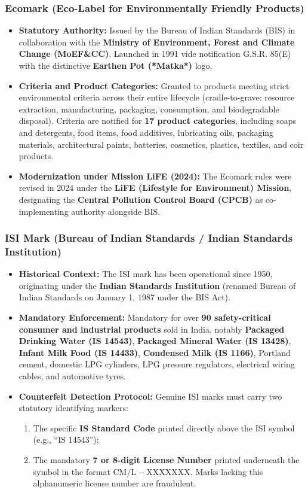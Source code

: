 \documentclass[11pt,a4paper,oneside]{article}
\begin{document}
\subsubsection{Ecomark (Eco-Label for Environmentally Friendly Products)}
\begin{itemize}[leftmargin=*]
    \item \textbf{Statutory Authority:} Issued by the Bureau of Indian Standards (BIS) in collaboration with the \textbf{Ministry of Environment, Forest and Climate Change (MoEF\&CC)}. Launched in 1991 vide notification G.S.R. 85(E) with the distinctive \textbf{Earthen Pot (*Matka*)} logo.
    \item \textbf{Criteria and Product Categories:} Granted to products meeting strict environmental criteria across their entire lifecycle (cradle-to-grave: resource extraction, manufacturing, packaging, consumption, and biodegradable disposal). Criteria are notified for \textbf{17 product categories}, including soaps and detergents, food items, food additives, lubricating oils, packaging materials, architectural paints, batteries, cosmetics, plastics, textiles, and coir products.
    \item \textbf{Modernization under Mission LiFE (2024):} The Ecomark rules were revised in 2024 under the \textbf{LiFE (Lifestyle for Environment) Mission}, designating the \textbf{Central Pollution Control Board (CPCB)} as co-implementing authority alongside BIS.
\end{itemize}

\subsubsection{ISI Mark (Bureau of Indian Standards / Indian Standards Institution)}
\begin{itemize}[leftmargin=*]
    \item \textbf{Historical Context:} The ISI mark has been operational since 1950, originating under the \textbf{Indian Standards Institution} (renamed Bureau of Indian Standards on January 1, 1987 under the BIS Act).
    \item \textbf{Mandatory Enforcement:} Mandatory for over \textbf{90 safety-critical consumer and industrial products} sold in India, notably \textbf{Packaged Drinking Water (IS 14543)}, \textbf{Packaged Mineral Water (IS 13428)}, \textbf{Infant Milk Food (IS 14433)}, \textbf{Condensed Milk (IS 1166)}, Portland cement, domestic LPG cylinders, LPG pressure regulators, electrical wiring cables, and automotive tyres.
    \item \textbf{Counterfeit Detection Protocol:} Genuine ISI marks must carry two statutory identifying markers:
    \begin{enumerate}[label=(\roman*)]
        \item The specific \textbf{IS Standard Code} printed directly above the ISI symbol (e.g., ``IS 14543'');
        \item The mandatory \textbf{7 or 8-digit License Number} printed underneath the symbol in the format \textbf{$\mathrm{CM/L-XXXXXXX}$}. Marks lacking this alphanumeric license number are fraudulent.
    \end{enumerate}
\end{itemize}
\end{document}
